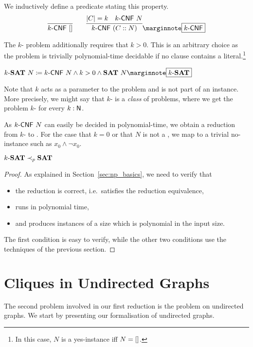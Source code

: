 We inductively define a predicate stating this property.
\begin{align*}
  \infer{\kCNF{k}~\nil}{} \qquad \infer{\kCNF{k}~(C :: N)}{\length{C} = k \quad \kCNF{k}~N}\mnote{\kCNF{k}}
\end{align*}

The $k$-\SAT{} problem additionally requires that $k > 0$. This is an arbitrary choice as the problem is trivially polynomial-time decidable if no clause contains a literal.\footnote{In this case, $N$ is a yes-instance iff $N = []$.}
\begin{definition}[$k$-\SAT{}]
  $\text{$k$-\SAT{}}~N \defeq \kCNF{k}~N \land k > 0 \land \SAT{}~N \mnote{$k$-\SAT{}}$
\end{definition}

\begin{remark}
Note that $k$ acts as a parameter to the problem and is not part of an instance. More precisely, we might say that $k$-\SAT{} is a \emph{class} of problems, where we get the problem $k$-\SAT{} for every $k : \mathsf{N}$. 
\end{remark}

As $\text{$k$-\textsf{CNF}}~N$ can easily be decided in polynomial-time, we obtain a reduction from $k$-\SAT{} to \SAT{}. For the case that $k = 0$ or that $N$ is not a , we map to a trivial no-instance such as $x_0 \land \lnot x_0$. 
\begin{lemma}
  $\text{$k$-\textbf{SAT}{}} \prec_p{} \textbf{SAT}{}$
\end{lemma}
\begin{proof}
  As explained in Section~\ref{sec:np_basics}, we need to verify that 
  \begin{itemize}
    \item the reduction is correct, i.e.\ satisfies the reduction equivalence, 
    \item runs in polynomial time, 
    \item and produces instances of a size which is polynomial in the input size.
  \end{itemize}
  The first condition is easy to verify, while the other two conditions use the techniques of the previous section.
\end{proof}

\newcommand{\UGraph}{\textsf{UGraph}}
\newcommand{\Edec}{\ensuremath{E_\textsf{dec}}}
\section{Cliques in Undirected Graphs}\label{sec:clique}
The second problem involved in our first reduction is the \Clique{} problem on undirected graphs. We start by presenting our formalisation of undirected graphs.

